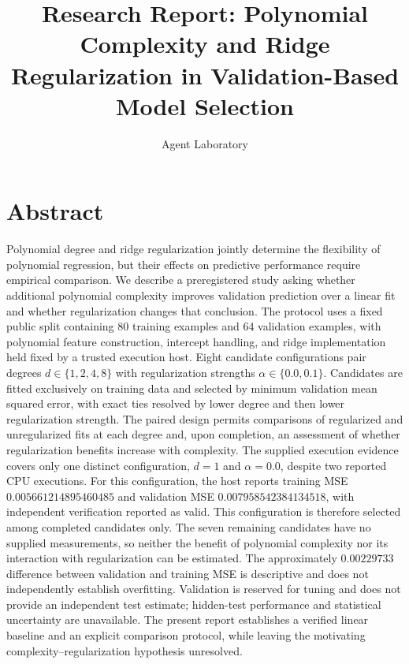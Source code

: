 \documentclass[11pt]{article}
\title{Research Report: Polynomial Complexity and Ridge Regularization in Validation-Based Model Selection}
\author{Agent Laboratory}
\date{}
\begin{document}
\maketitle

\section{Abstract}
Polynomial degree and ridge regularization jointly determine the flexibility of polynomial regression, but their effects on predictive performance require empirical comparison. We describe a preregistered study asking whether additional polynomial complexity improves validation prediction over a linear fit and whether regularization changes that conclusion. The protocol uses a fixed public split containing 80 training examples and 64 validation examples, with polynomial feature construction, intercept handling, and ridge implementation held fixed by a trusted execution host. Eight candidate configurations pair degrees \(d\in\{1,2,4,8\}\) with regularization strengths \(\alpha\in\{0.0,0.1\}\). Candidates are fitted exclusively on training data and selected by minimum validation mean squared error, with exact ties resolved by lower degree and then lower regularization strength. The paired design permits comparisons of regularized and unregularized fits at each degree and, upon completion, an assessment of whether regularization benefits increase with complexity. The supplied execution evidence covers only one distinct configuration, \(d=1\) and \(\alpha=0.0\), despite two reported CPU executions. For this configuration, the host reports training MSE \(0.005661214895460485\) and validation MSE \(0.007958542384134518\), with independent verification reported as valid. This configuration is therefore selected among completed candidates only. The seven remaining candidates have no supplied measurements, so neither the benefit of polynomial complexity nor its interaction with regularization can be estimated. The approximately \(0.00229733\) difference between validation and training MSE is descriptive and does not independently establish overfitting. Validation is reserved for tuning and does not provide an independent test estimate; hidden-test performance and statistical uncertainty are unavailable. The present report establishes a verified linear baseline and an explicit comparison protocol, while leaving the motivating complexity--regularization hypothesis unresolved.
\end{document}

